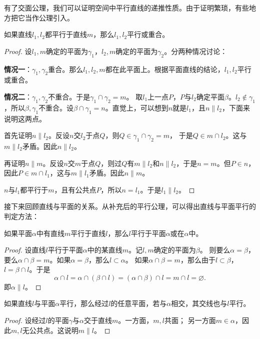 \documentclass[12pt,UTF8]{ctexbook}
\begin{document}
有了交面公理，我们可以证明空间中平行直线的递推性质。由于证明繁琐，有些地方把它当作公理引入。
\begin{tm}\label{tm:1-0-10}
    如果直线$l_1,l_2$都平行于直线$m$，那么$l_1,l_2$平行或重合。
\end{tm}
\begin{proof}
    设$l_1,m$确定的平面为$\gamma_1$，$l_2,m$确定的平面为$\gamma_2$。分两种情况讨论：

    \textbf{情况一}：$\gamma_1, \gamma_2$重合。那么$l_1,l_2,m$都在此平面上。根据平面直线的结论，$l_1,l_2$平行或重合。
    
    \textbf{情况二}：$\gamma_1, \gamma_2$不重合。于是$\gamma_1\cap \gamma_2 = m$。
    取$l_1$上一点$P$，$P$与$l_2$确定平面$\beta$。$l_2\notin\gamma_1$，所以$\beta,\gamma_1$不重合。设$\beta\cap\gamma_1 = n$。直觉上，可以想到$n$就是$l_1$，且$n\parallel l_2$，下面来说明这两点。
    
    首先证明$n\parallel l_2$。反设$n$交$l_2$于点$Q$，则$Q\in\gamma_1\cap\gamma_2=m$，
    于是$Q\in m\cap l_2$。这与$m\parallel l_2$矛盾。因此$n\parallel l_2$。
    
    再证明$n\parallel m$。反设$n$交$m$于点$Q$，则过$Q$有$m\parallel l_2$和$n\parallel l_2$，于是$n=m$。但$P\in n$，因此$P\in m\cap l_1$，这与$m\parallel l_1$矛盾。因此$n\parallel m$。
    
    $n$与$l_1$都平行于$m$，且有公共点$P$，所以$n = l_1$。于是$l_1\parallel l_2$。

\end{proof}

接下来回顾直线与平面的关系。从补充后的平行公理，可以得出直线与平面平行的判定方法：

\begin{tm}\label{tm:1-0-20}
    如果平面$\alpha$中有直线$m$平行于直线$l$，那么$l$平行于平面$\alpha$或在$\alpha$中。
\end{tm}
\begin{proof}
    设直线$l$平行于平面$\alpha$中的某直线$m$。记$l,m$确定的平面为$\beta$。
    则要么$\alpha = \beta$，要么$\alpha\cap\beta = m$。如果$\alpha=\beta$，那么$l\subset\alpha$。
    如果$\alpha\cap\beta = m$，那么由于$l \subset \beta$，$l = \beta \cap l$。于是
    $$\alpha\cap l = \alpha\cap (\beta \cap l) = (\alpha\cap\beta) \cap l = m\cap l = \varnothing. $$
    即$\alpha \parallel l$。
\end{proof}
\begin{tm}\label{tm:1-0-30}
    如果直线$l$与平面$\alpha$平行，那么经过$l$的任意平面，若与$\alpha$相交，其交线也与$l$平行。
\end{tm}
\begin{proof}
    设经过$l$的平面$\gamma$与$\alpha$交于直线$m$。一方面，$m,l$共面；
    另一方面$m\in\alpha$，因此$m,l$无公共点。这说明$m\parallel l$。
\end{proof}
\end{document}
